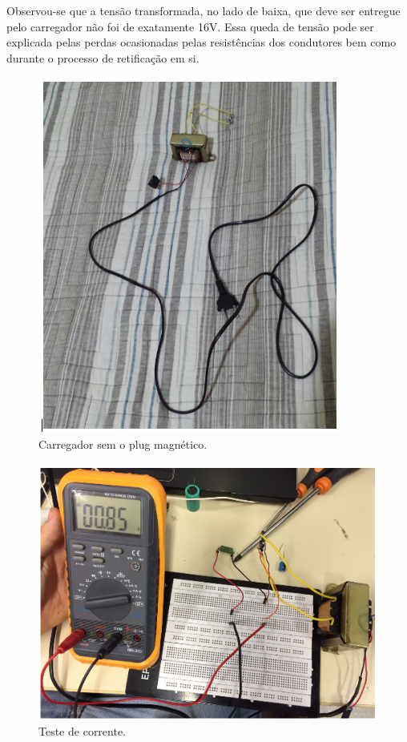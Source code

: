Observou-se que a tensão transformada, no lado de baixa, que deve ser entregue pelo carregador não foi de exatamente 16V. Essa queda de tensão pode ser explicada pelas perdas ocasionadas pelas resistências dos condutores bem como durante o processo de retificação em si.

 \begin{figure}[H]
	\centering
	\includegraphics[scale=0.5]{figuras/carregadorsemplugmag}
	\caption{Carregador sem o plug magnético.}
	\label{img:carregadorsemplugmag}
\end{figure}

 \begin{figure}[H]
	\centering
	\includegraphics[scale=0.5]{figuras/testedecorrentecarregador}
	\caption{Teste de corrente.}
	\label{img:testedecorrentecarregador}
\end{figure}

